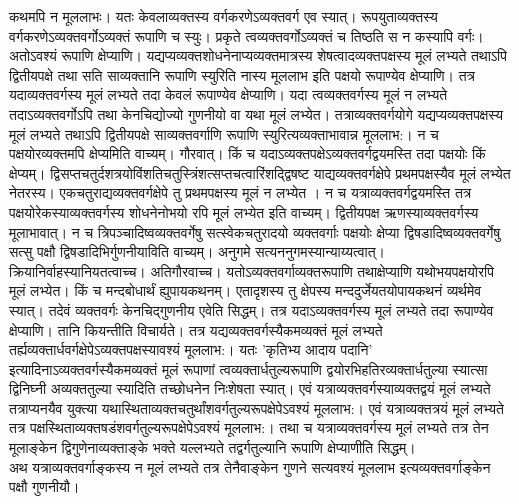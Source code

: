 \documentclass[11pt, openany]{book}
\begin{document}
\begin{sloppypar}
\hangindent=0.2in कथमपि न मूललाभः। यतः केवलाव्यक्तस्य वर्गकरणेऽव्यक्तवर्ग एव स्यात्। रूपयुताव्यक्तस्य वर्गकरणेऽव्यक्तवर्गोऽव्यक्तं रूपाणि च स्युः। प्रकृते त्वव्यक्तवर्गोऽव्यक्तं च तिष्ठति स न कस्यापि वर्गः। अतोऽवश्यं रूपाणि क्षेप्याणि। यद्यप्यव्यक्तशोधनेनाप्यव्यक्तमात्रस्य शेषत्वादव्यक्तपक्षस्य मूलं लभ्यते तथाऽपि द्वितीयपक्षे तथा सति साव्यक्तानि रूपाणि स्युरिति नास्य मूललाभ इति पक्षयो रूपाण्येव क्षेप्याणि। तत्र यदाव्यक्तवर्गस्य मूलं लभ्यते तदा केवलं रूपाण्येव क्षेप्याणि। यदा त्वव्यक्तवर्गस्य मूलं न लभ्यते तदाऽव्यक्तवर्गोऽपि तथा केनचिद्योज्यो गुणनीयो वा यथा मूलं लभ्येत। तत्राव्यक्तवर्गयोगे यद्यप्यव्यक्तपक्षस्य मूलं लभ्यते तथाऽपि द्वितीयपक्षे साव्यक्तवर्गाणि रूपाणि स्युरित्यव्यक्ताभावान्न मूललाभ:। न च पक्षयोरव्यक्तमपि क्षेप्यमिति वाच्यम्। गौरवात्। किं च यदाऽव्यक्तपक्षेऽव्यक्तवर्गद्वयमस्ति तदा पक्षयोः किं क्षेप्यम्। द्विसप्तचतुर्दशत्रयोविंशतिचतुस्त्रिंशत्सप्तचत्वारिंशद्द्विषष्ट याद्यव्यक्तवर्गक्षेपे प्रथमपक्षस्यैव मूलं लभ्येत नेतरस्य। एकचतुराद्यव्यक्तवर्गक्षेपे तु प्रथमपक्षस्य मूलं न लभ्येत । न च यत्राव्यक्तवर्गद्वयमस्ति तत्र पक्षयोरेकस्याव्यक्तवर्गस्य शोधनेनोभयो रपि मूलं लभ्येत इति वाच्यम्। द्वितीयपक्ष ऋणस्याव्यक्तवर्गस्य मूलाभावात्। न च त्रिपञ्चादिष्वव्यक्तवर्गेषु सत्स्वेकचतुरादयो व्यक्तवर्गाः पक्षयोः क्षेप्या द्विषडादिष्वव्यक्तवर्गेषु सत्सु पक्षौ द्विषडादिभिर्गुणनीयाविति वाच्यम्। अनुगमे सत्यननुगमस्यान्याय्यत्वात्। क्रियानिर्वाहस्यानियतत्वाच्च। अतिगौरवाच्च। यतोऽव्यक्तवर्गाव्यक्तरूपाणि तथाक्षेप्याणि यथोभयपक्षयोरपि मूलं लभ्येत। किं च मन्दबोधार्थं ह्युपायकथनम्। एतादृशस्य तु क्षेपस्य मन्ददुर्जेयतयोपायकथनं व्यर्थमेव स्यात्। तदेवं व्यक्तवर्गः केनचिद्गुणनीय एवेति सिद्धम्। तत्र यदाऽव्यक्तवर्गस्य मूलं लभ्यते तदा रूपाण्येव क्षेप्याणि। तानि कियन्तीति विचार्यते। तत्र यद्यव्यक्तवर्गस्यैकमव्यक्तं मूलं लभ्यते तर्ह्यव्यक्तार्धवर्गक्षेपेऽव्यक्तपक्षस्यावश्यं मूललाभ:। यतः 'कृतिभ्य आदाय पदानि' इत्यादिनाऽव्यक्तवर्गस्यैकमव्यक्तं मूलं रूपाणां त्वव्यक्तार्धतुल्यरूपाणि द्वयोरभिहतिरव्यक्तार्धतुल्या स्यात्सा द्विनिघ्नी अव्यक्ततुल्या स्यादिति तच्छोधनेन निःशेषता स्यात्। एवं यत्राव्यक्तवर्गस्याव्यक्तद्वयं मूलं लभ्यते तत्राप्यनयैव युक्त्या यथास्थिताव्यक्तचतुर्थांशवर्गतुल्यरूपक्षेपेऽवश्यं मूललाभ:। एवं यत्राव्यक्तत्रयं मूलं लभ्यते तत्र पक्षस्थिताव्यक्तषडंशवर्गतुल्यरूपक्षेपेऽवश्यं मूललाभ:। तथा च यत्राव्यक्तवर्गस्य मूलं लभ्यते तत्र तेन मूलाङ्केन द्विगुणेनाव्यक्ताङ्के भक्ते यल्लभ्यते तद्वर्गतुल्यानि रूपाणि क्षेप्याणीति सिद्धम्।\\

\hangindent=0.2in \hspace{0.2in}अथ यत्राव्यक्तवर्गाङ्कस्य न मूलं लभ्यते तत्र तेनैवाङ्केन गुणने सत्यवश्यं मूललाभ इत्यव्यक्तवर्गाङ्केन पक्षौ गुणनीयौ।
\end{sloppypar}
\thispagestyle{empty}
\newpage
\end{document}
